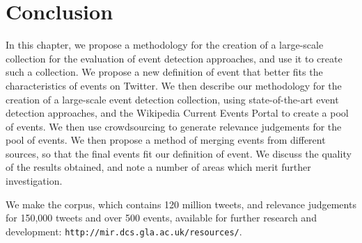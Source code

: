 

\section{Conclusion}
\label{sec:conclusion}
\label{collection:sec:conclusion}
In this chapter, we propose a methodology for the creation of a large-scale collection for the evaluation of event detection approaches, and use it to create such a collection.
We propose a new definition of event that better fits the characteristics of events on Twitter.
We then describe our methodology for the creation of a large-scale event detection collection, using state-of-the-art event detection approaches, and the Wikipedia Current Events Portal to create a pool of events.
We then use crowdsourcing to generate relevance judgements for the pool of events.
We then propose a method of merging events from different sources, so that the final events fit our definition of event.
We discuss the quality of the results obtained, and note a number of areas which merit further investigation.

We make the corpus, which contains 120 million tweets, and relevance judgements for 150,000 tweets and over 500 events, available for further research and development: \texttt{http://mir.dcs.gla.ac.uk/resources/}.
